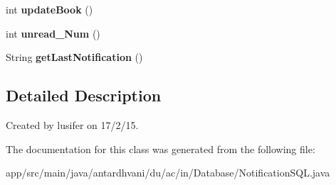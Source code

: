 \begin{DoxyCompactItemize}
\item 
\hypertarget{classantardhvani_1_1du_1_1ac_1_1in_1_1_database_1_1_notification_s_q_l_aa188787b119b009e4f49302d855d4497}{}int {\bfseries update\+Book} ()\label{classantardhvani_1_1du_1_1ac_1_1in_1_1_database_1_1_notification_s_q_l_aa188787b119b009e4f49302d855d4497}

\item 
\hypertarget{classantardhvani_1_1du_1_1ac_1_1in_1_1_database_1_1_notification_s_q_l_ab7e11051192b57a573f1f0ad599a689e}{}int {\bfseries unread\+\_\+\+Num} ()\label{classantardhvani_1_1du_1_1ac_1_1in_1_1_database_1_1_notification_s_q_l_ab7e11051192b57a573f1f0ad599a689e}

\item 
\hypertarget{classantardhvani_1_1du_1_1ac_1_1in_1_1_database_1_1_notification_s_q_l_a25771e2284d36a64e96e9b646c0d94dc}{}String {\bfseries get\+Last\+Notification} ()\label{classantardhvani_1_1du_1_1ac_1_1in_1_1_database_1_1_notification_s_q_l_a25771e2284d36a64e96e9b646c0d94dc}

\end{DoxyCompactItemize}


\subsection{Detailed Description}
Created by lusifer on 17/2/15. 

The documentation for this class was generated from the following file\+:\begin{DoxyCompactItemize}
\item 
app/src/main/java/antardhvani/du/ac/in/\+Database/Notification\+S\+Q\+L.\+java\end{DoxyCompactItemize}
